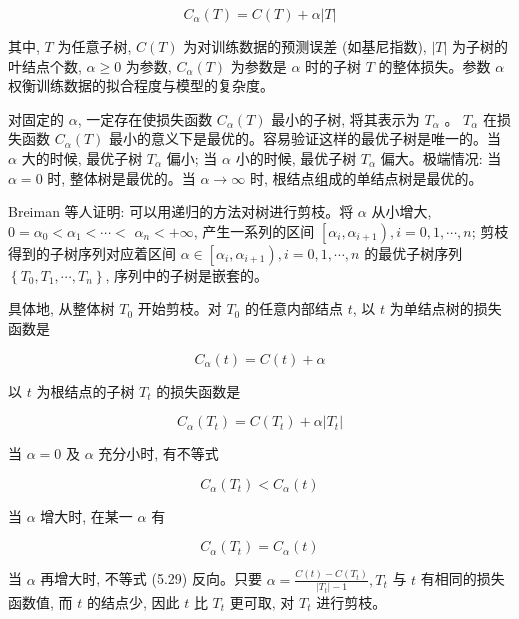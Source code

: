 \documentclass[10pt]{article}
\begin{document}
\begin{CJK*}{UTF8}{bsmi}
\begin{equation*}
C_{\alpha}(T)=C(T)+\alpha|T| \tag{5.26}
\end{equation*}


其中, $T$ 为任意子树, $C(T)$ 为对训练数据的预测误差 (如基尼指数), $|T|$ 为子树的叶结点个数, $\alpha \geqslant 0$ 为参数, $C_{\alpha}(T)$ 为参数是 $\alpha$ 时的子树 $T$ 的整体损失。参数 $\alpha$ 权衡训练数据的拟合程度与模型的复杂度。

对固定的 $\alpha$, 一定存在使损失函数 $C_{\alpha}(T)$ 最小的子树, 将其表示为 $T_{\alpha}$ 。 $T_{\alpha}$ 在损失函数 $C_{\alpha}(T)$ 最小的意义下是最优的。容易验证这样的最优子树是唯一的。当 $\alpha$ 大的时候, 最优子树 $T_{\alpha}$ 偏小; 当 $\alpha$ 小的时候, 最优子树 $T_{\alpha}$ 偏大。极端情况: 当 $\alpha=0$ 时, 整体树是最优的。当 $\alpha \rightarrow \infty$ 时, 根结点组成的单结点树是最优的。

Breiman 等人证明: 可以用递归的方法对树进行剪枝。将 $\alpha$ 从小增大, $0=\alpha_{0}<\alpha_{1}<\cdots<$ $\alpha_{n}<+\infty$, 产生一系列的区间 $\left[\alpha_{i}, \alpha_{i+1}\right), i=0,1, \cdots, n$; 剪枝得到的子树序列对应着区间 $\alpha \in\left[\alpha_{i}, \alpha_{i+1}\right), i=0,1, \cdots, n$ 的最优子树序列 $\left\{T_{0}, T_{1}, \cdots, T_{n}\right\}$, 序列中的子树是嵌套的。

具体地, 从整体树 $T_{0}$ 开始剪枝。对 $T_{0}$ 的任意内部结点 $t$, 以 $t$ 为单结点树的损失函数是


\begin{equation*}
C_{\alpha}(t)=C(t)+\alpha \tag{5.27}
\end{equation*}


以 $t$ 为根结点的子树 $T_{t}$ 的损失函数是


\begin{equation*}
C_{\alpha}\left(T_{t}\right)=C\left(T_{t}\right)+\alpha\left|T_{t}\right| \tag{5.28}
\end{equation*}


当 $\alpha=0$ 及 $\alpha$ 充分小时, 有不等式


\begin{equation*}
C_{\alpha}\left(T_{t}\right)<C_{\alpha}(t) \tag{5.29}
\end{equation*}


当 $\alpha$ 增大时, 在某一 $\alpha$ 有


\begin{equation*}
C_{\alpha}\left(T_{t}\right)=C_{\alpha}(t) \tag{5.30}
\end{equation*}


当 $\alpha$ 再增大时, 不等式 (5.29) 反向。只要 $\alpha=\frac{C(t)-C\left(T_{t}\right)}{\left|T_{t}\right|-1}, T_{t}$ 与 $t$ 有相同的损失函数值, 而 $t$ 的结点少, 因此 $t$ 比 $T_{t}$ 更可取, 对 $T_{t}$ 进行剪枝。


\end{CJK*}
\end{document}
